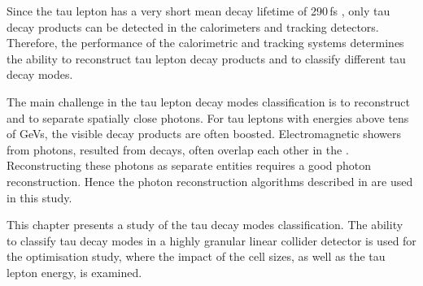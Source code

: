 Since the tau lepton has a very short mean decay lifetime of 290\,fs \cite{Abreu:1991jn}, only tau decay products can be detected in the calorimeters and tracking detectors. Therefore, the performance of the calorimetric and tracking systems determines the ability to reconstruct tau lepton decay products and to classify different tau decay modes.


The main challenge in the tau lepton decay modes  classification is to reconstruct and to separate spatially close photons. For  tau leptons with energies above tens of GeVs, the visible decay products are often boosted.  Electromagnetic showers from photons, resulted from \Ppizero decays, often overlap each other in the \ECAL.  Reconstructing these photons as separate entities requires a good photon reconstruction. Hence the photon reconstruction algorithms described in  are used in this study.







%

This chapter presents a study of the tau decay modes classification. The ability to classify tau decay modes in a highly granular linear collider detector is used for the \ECAL optimisation study, where the impact of  the \ECAL cell sizes,  as well as the tau lepton energy, is examined.

